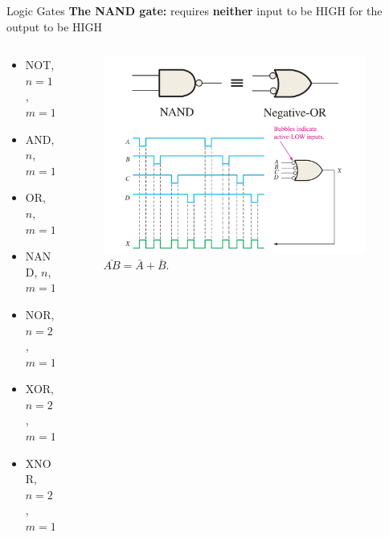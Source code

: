 \documentclass{beamer}
\begin{document}
\begin{frame}{Logic Gates}
\textbf{The NAND gate:} requires \textbf{neither} input to be HIGH for the output to be HIGH \\ \vspace{0.5cm}
\begin{columns}[T]
\begin{column}{0.5\textwidth}
\begin{itemize}
\item \alert{NOT, $n=1$, $m=1$}
\item \alert{AND, $n$, $m=1$}
\item \alert{OR, $n$, $m=1$}
\item \alert{NAND, $n$, $m=1$}
\item NOR, $n=2$, $m=1$
\item XOR, $n=2$, $m=1$
\item XNOR, $n=2$, $m=1$
\end{itemize}
\end{column}
\begin{column}{0.5\textwidth}
\begin{figure}
\centering
\includegraphics[width=0.95\textwidth]{figures/NegativeOR.pdf}
\caption{\label{fig:nand3} $\bar{AB} = \bar{A} + \bar{B}$.}
\end{figure}
\end{column}
\end{columns}
\end{frame}
\end{document}

